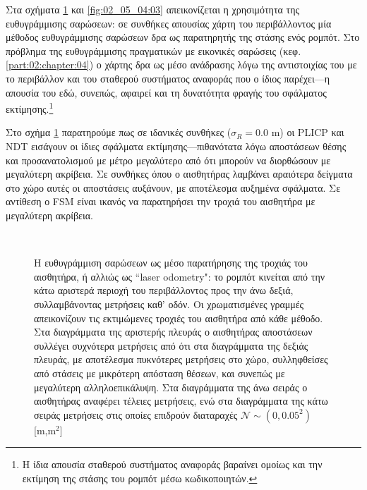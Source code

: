 Στα σχήματα \ref{fig:02_05_04:02} και \ref{fig:02_05_04:03} απεικονίζεται η
χρησιμότητα της ευθυγράμμισης σαρώσεων: σε συνθήκες απουσίας χάρτη του
περιβάλλοντος μία μέθοδος ευθυγράμμισης σαρώσεων δρα ως παρατηρητής της στάσης
ενός ρομπότ. Στο πρόβλημα της ευθυγράμμισης πραγματικών με εικονικές σαρώσεις
(κεφ. \ref{part:02:chapter:04}) ο χάρτης δρα ως μέσο ανάδρασης λόγω της
αντιστοιχίας του με το περιβάλλον και του σταθερού συστήματος αναφοράς που ο
ίδιος παρέχει---η απουσία του εδώ, συνεπώς, αφαιρεί και τη δυνατότητα φραγής
του σφάλματος εκτίμησης.\footnote{Η ίδια απουσία σταθερού συστήματος αναφοράς
βαραίνει ομοίως και την εκτίμηση της στάσης του ρομπότ μέσω κωδικοποιητών.}

Στο σχήμα \ref{fig:02_05_04:02} παρατηρούμε πως σε ιδανικές συνθήκες ($\sigma_R
= 0.0$ m) οι PLICP και NDT εισάγουν οι ίδιες σφάλματα εκτίμησης---πιθανότατα
λόγω αποστάσεων θέσης και προσανατολισμού με μέτρο μεγαλύτερο από ότι μπορούν
να διορθώσουν με μεγαλύτερη ακρίβεια. Σε συνθήκες όπου ο αισθητήρας λαμβάνει
αραιότερα δείγματα στο χώρο αυτές οι αποστάσεις αυξάνουν, με αποτέλεσμα
αυξημένα σφάλματα. Σε αντίθεση ο FSM είναι ικανός να παρατηρήσει την τροχιά του
αισθητήρα με μεγαλύτερη ακρίβεια.

\begin{figure}[]\centering
  \begin{subfigure}{\linewidth}
    
  \end{subfigure}\\ \vspace{-5cm}
  \begin{subfigure}{\linewidth}
    
  \end{subfigure}
  \vspace{-2cm}
  \caption{\small Η ευθυγράμμιση σαρώσεων ως μέσο παρατήρησης της τροχιάς του
           αισθητήρα, ή αλλιώς ως ``laser odometry": το ρομπότ κινείται από
           την κάτω αριστερά περιοχή του περιβάλλοντος προς την άνω δεξιά,
           συλλαμβάνοντας μετρήσεις καθ' οδόν. Οι χρωματισμένες γραμμές
           απεικονίζουν τις εκτιμώμενες τροχιές του αισθητήρα από κάθε μέθοδο.
           Στα διαγράμματα της αριστερής πλευράς ο αισθητήρας αποστάσεων
           συλλέγει συχνότερα μετρήσεις από ότι στα διαγράμματα της δεξιάς
           πλευράς, με αποτέλεσμα πυκνότερες μετρήσεις στο χώρο, συλληφθείσες
           από στάσεις με μικρότερη απόσταση θέσεων, και συνεπώς με
           μεγαλύτερη αλληλοεπικάλυψη. Στα διαγράμματα της άνω σειράς ο
           αισθητήρας αναφέρει τέλειες μετρήσεις, ενώ στα διαγράμματα της κάτω
           σειράς μετρήσεις στις οποίες επιδρούν διαταραχές
           $\mathcal{N}\sim(0,0.05^2)$ [m,m$^2$]}
  \label{fig:02_05_04:02}
\end{figure}

